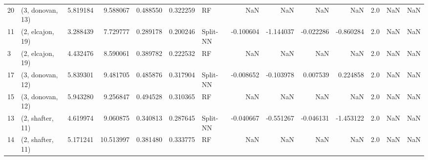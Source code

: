 \begin{tabular}{llrrrrlrrrrrrl}
20 &  (3, donovan, 13) &   5.819184 &   9.588067 &   0.488550 &  0.322259 &          RF &             NaN &           NaN &            NaN &          NaN &            2.0 &    NaN &              NaN \\
11 &  (2, elcajon, 19) &   3.288439 &   7.729777 &   0.289178 &  0.200246 &    Split-NN &       -0.100604 &     -1.144037 &      -0.022286 &    -0.860284 &            2.0 &    NaN &              NaN \\
3  &  (2, elcajon, 19) &   4.432476 &   8.590061 &   0.389782 &  0.222532 &          RF &             NaN &           NaN &            NaN &          NaN &            2.0 &    NaN &              NaN \\
17 &  (3, donovan, 12) &   5.839301 &   9.481705 &   0.485876 &  0.317904 &    Split-NN &       -0.008652 &     -0.103978 &       0.007539 &     0.224858 &            2.0 &    NaN &              NaN \\
15 &  (3, donovan, 12) &   5.943280 &   9.256847 &   0.494528 &  0.310365 &          RF &             NaN &           NaN &            NaN &          NaN &            2.0 &    NaN &              NaN \\
13 &  (2, shafter, 11) &   4.619974 &   9.060875 &   0.340813 &  0.287645 &    Split-NN &       -0.040667 &     -0.551267 &      -0.046131 &    -1.453122 &            2.0 &    NaN &              NaN \\
14 &  (2, shafter, 11) &   5.171241 &  10.513997 &   0.381480 &  0.333775 &          RF &             NaN &           NaN &            NaN &          NaN &            2.0 &    NaN &              NaN \\
\bottomrule
\end{tabular}

